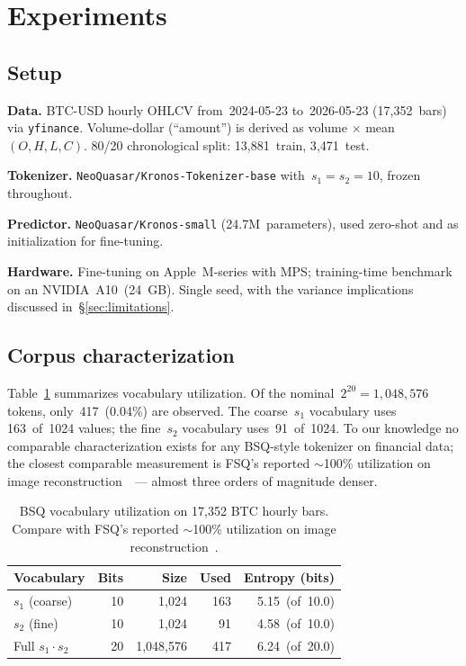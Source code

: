 \documentclass[10pt]{article}
\begin{document}
\section{Experiments}\label{sec:experiments}

\subsection{Setup}

\textbf{Data.} BTC-USD hourly OHLCV from~2024-05-23 to~2026-05-23
(17{,}352~bars) via \texttt{yfinance}. Volume-dollar
(``amount'') is derived as
volume$\,\times\,$mean$(O,H,L,C)$. 80/20 chronological split:
13{,}881~train, 3{,}471~test.

\textbf{Tokenizer.} \texttt{NeoQuasar/Kronos-Tokenizer-base}
with~$s_1=s_2=10$, frozen throughout.

\textbf{Predictor.} \texttt{NeoQuasar/Kronos-small}
(24.7M~parameters), used zero-shot and as initialization for
fine-tuning.

\textbf{Hardware.} Fine-tuning on Apple~M-series with MPS;
training-time benchmark on an NVIDIA~A10~(24~GB). Single seed, with
the variance implications discussed in~\S\ref{sec:limitations}.

\subsection{Corpus characterization}\label{sec:corpus}

Table~\ref{tab:vocab} summarizes vocabulary utilization. Of the
nominal~$2^{20}=1{,}048{,}576$ tokens, only~417~(0.04\%) are
observed. The coarse~$s_1$ vocabulary uses 163~of~1024 values; the
fine~$s_2$ vocabulary uses~91~of~1024. To our knowledge no comparable
characterization exists for any BSQ-style tokenizer on financial
data; the closest comparable measurement is FSQ's
reported \mbox{$\sim$100\%} utilization on image
reconstruction~\citep{fsq2024}~--- almost three orders of magnitude
denser.

\begin{table}[t]
\centering
\caption{BSQ vocabulary utilization on 17{,}352 BTC hourly bars.
Compare with FSQ's reported \mbox{$\sim$100\%} utilization on image
reconstruction~\citep{fsq2024}.}\label{tab:vocab}
\begin{tabular}{lrrrr}
\toprule
Vocabulary & Bits & Size & Used & Entropy (bits) \\
\midrule
$s_1$ (coarse) & 10 & 1{,}024 & 163 & 5.15~(of~10.0) \\
$s_2$ (fine)   & 10 & 1{,}024 &  91 & 4.58~(of~10.0) \\
Full $s_1 \cdot s_2$ & 20 & 1{,}048{,}576 & 417 & 6.24~(of~20.0) \\
\bottomrule
\end{tabular}
\end{table}
\end{document}

